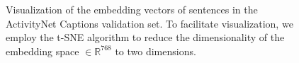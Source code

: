 \begin{figure}
    \centering
    \caption{Visualization of the embedding vectors of sentences in the ActivityNet Captions validation set.
    To facilitate visualization, we employ the t-SNE algorithm to reduce the dimensionality of the embedding space $\in \mathbb{R}^{768}$ to two dimensions.}
    \label{fig:latent_space}
\end{figure}